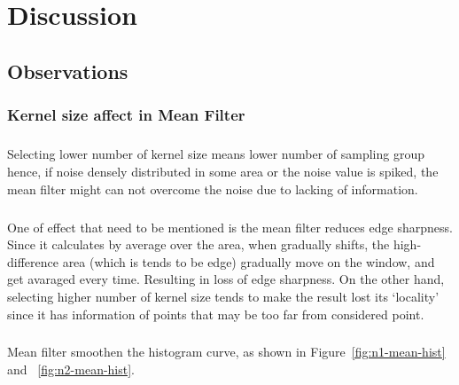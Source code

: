 \documentclass[12pt,a4paper]{report}
\begin{document}
\chapter{Discussion}
\section{Observations}
\subsection{Kernel size affect in Mean Filter}
\paragraph*{}
Selecting lower number of kernel size means lower number of sampling group hence, if noise densely distributed in some area or the noise value is spiked, the mean filter might can not overcome the noise due to lacking of information.
\paragraph*{}One of effect that need to be mentioned is the mean filter reduces edge sharpness. Since it calculates by average over the area, when gradually shifts, the high-difference area (which is tends to be edge) gradually move on the window, and get avaraged every time. Resulting in loss of edge sharpness.
On the other hand, selecting higher number of kernel size tends to make the result lost its `locality' since it has information of points that may be too far from considered point. 
\paragraph*{}Mean filter smoothen the histogram curve, as shown in Figure~\ref{fig:n1-mean-hist} and ~\ref{fig:n2-mean-hist}.
\end{document}
